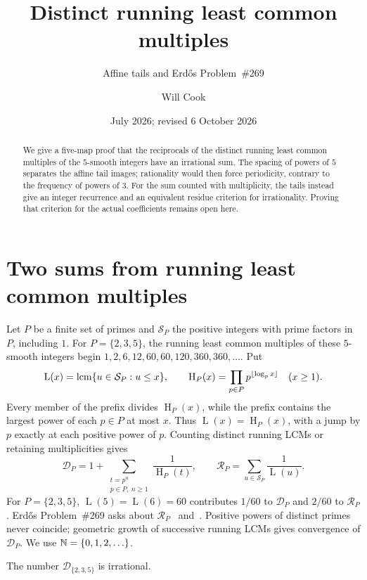 \documentclass[11pt]{article}
\title{Distinct running least common multiples}
\subtitle{Affine tails and Erd\H{o}s Problem~\#269}
\author{Will Cook}
\date{July 2026; revised 6 October 2026}
\newcommand{\hgt}{\operatorname{H}}
\newcommand{\Lprefix}{\operatorname{L}}
\begin{document}
\maketitle
\noteprovenance

\begin{abstract}
We give a five-map proof that the reciprocals of the distinct running least
common multiples of the $5$-smooth integers have an irrational sum.
The spacing of powers of $5$ separates the affine tail images; rationality
would then force periodicity, contrary to the frequency of powers of $3$.
For the sum counted with multiplicity, the tails instead give an integer
recurrence and an equivalent residue criterion for irrationality. Proving
that criterion for the actual coefficients remains open here.
\end{abstract}

\section{Two sums from running least common multiples}\label{sec:problem}
Let $P$ be a finite set of primes and $\mathcal S_P$ the positive integers
with prime factors in $P$, including $1$. For $P=\{2,3,5\}$, the running
least common multiples of these $5$-smooth integers begin
$1,2,6,12,60,60,120,360,360,\ldots$. Put
\[
 \Lprefix(x)=\lcm\{u\in\mathcal S_P:u\le x\},\qquad
 \hgt_P(x)=\prod_{p\in P}p^{\lfloor\log_p x\rfloor}\quad(x\ge1).
\]
Every member of the prefix divides $\hgt_P(x)$, while the prefix contains
the largest power of each $p\in P$ at most $x$. Thus
$\Lprefix(x)=\hgt_P(x)$, with a jump by $p$ exactly at each positive
power of $p$. Counting distinct running LCMs or retaining multiplicities gives
\[
 \mathcal D_P=1+\sum_{\substack{t=p^n\\p\in P,\ n\ge1}}\frac1{\hgt_P(t)},
 \qquad
 \mathcal R_P=\sum_{u\in\mathcal S_P}\frac1{\Lprefix(u)}.
\]
For $P=\{2,3,5\}$, $\Lprefix(5)=\Lprefix(6)=60$ contributes $1/60$ to
$\mathcal D_P$ and $2/60$ to $\mathcal R_P$. Erd\H{o}s Problem~\#269 asks about
$\mathcal R_P$~\cite[p.~65]{erdosgraham1980} and~\cite[p.~106]{erdos1988}.
Positive powers of distinct primes never coincide; geometric growth of
successive running LCMs gives convergence of $\mathcal D_P$.
We use $\mathbb{N}=\{0,1,2,\ldots\}$.

\begin{theorem}\label{res:distinct-height-235}
The number $\mathcal D_{\{2,3,5\}}$ is irrational.
\end{theorem}
\end{document}
